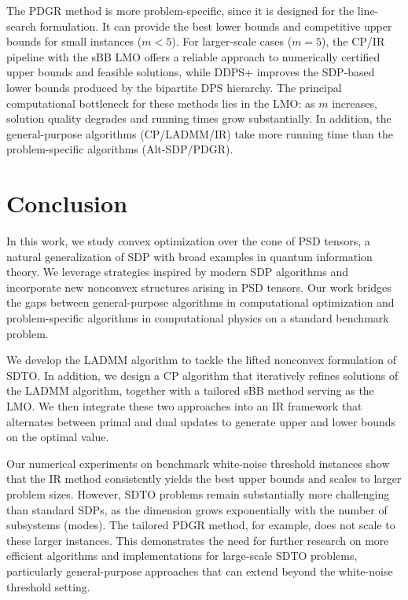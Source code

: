 \documentclass[smallextended]{svjour3}
\newcommand{\1}{\mathbf{1}}
\begin{document}
The PDGR method is more problem-specific, since it is designed for the line-search formulation. It can provide the best lower bounds and competitive upper bounds for small instances ($m < 5$). For larger-scale cases ($m = 5$), the CP/IR pipeline with the sBB LMO offers a reliable approach to numerically certified upper bounds and feasible solutions, while DDPS+ improves the SDP-based lower bounds produced by the bipartite DPS hierarchy. The principal computational bottleneck for these methods lies in the LMO: as $m$ increases, solution quality degrades and running times grow substantially. In addition, the general-purpose algorithms (CP/LADMM/IR) take more running time than the problem-specific algorithms (Alt-SDP/PDGR).


\section{Conclusion}


In this work, we study convex optimization over the cone of PSD tensors, a natural generalization of SDP with broad examples in quantum information theory. We leverage strategies inspired by modern SDP algorithms and incorporate new nonconvex structures arising in PSD tensors. Our work bridges the gaps between general-purpose algorithms in computational optimization and problem-specific algorithms in computational physics on a standard benchmark problem.

We develop the LADMM algorithm to tackle the lifted nonconvex formulation of SDTO. In addition, we design a CP algorithm that iteratively refines solutions of the LADMM algorithm, together with a tailored sBB method serving as the LMO. We then integrate these two approaches into an IR framework that alternates between primal and dual updates to generate upper and lower bounds on the optimal value.

Our numerical experiments on benchmark white-noise threshold instances show that the IR method consistently yields the best upper bounds and scales to larger problem sizes. However, SDTO problems remain substantially more challenging than standard SDPs, as the dimension grows exponentially with the number of subsystems (modes). The tailored PDGR method, for example, does not scale to these larger instances. This demonstrates the need for further research on more efficient algorithms and implementations for large-scale SDTO problems, particularly general-purpose approaches that can extend beyond the white-noise threshold setting.
\end{document}
